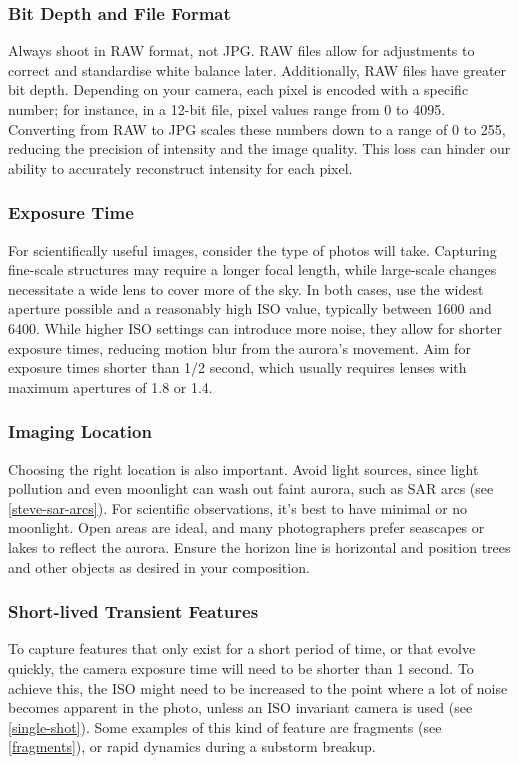 \documentclass{article}
\begin{document}
\subsubsection{Bit Depth and File Format}
Always shoot in RAW format, not JPG. RAW files allow for adjustments to correct and standardise white balance later. Additionally, RAW files have greater bit depth. Depending on your camera, each pixel is encoded with a specific number; for instance, in a 12-bit file, pixel values range from 0 to 4095. Converting from RAW to JPG scales these numbers down to a range of 0 to 255, reducing the precision of intensity and the image quality. This loss can hinder our ability to accurately reconstruct intensity for each pixel.

\subsubsection{Exposure Time}
For scientifically useful images, consider the type of photos will take. Capturing fine-scale structures may require a longer focal length, while large-scale changes necessitate a wide lens to cover more of the sky. In both cases, use the widest aperture possible and a reasonably high ISO value, typically between 1600 and 6400. While higher ISO settings can introduce more noise, they allow for shorter exposure times, reducing motion blur from the aurora's movement. Aim for exposure times shorter than 1/2 second, which usually requires lenses with maximum apertures of 1.8 or 1.4.

\subsubsection{Imaging Location}
Choosing the right location is also important. Avoid light sources, since light pollution and even moonlight can wash out faint aurora, such as SAR arcs (see \ref{steve-sar-arcs}). For scientific observations, it’s best to have minimal or no moonlight. Open areas are ideal, and many photographers prefer seascapes or lakes to reflect the aurora. Ensure the horizon line is horizontal and position trees and other objects as desired in your composition.

\subsubsection{Short-lived Transient Features}\label{short-lived-transient-features}
To capture features that only exist for a short period of time, or that evolve quickly, the camera exposure time will need to be shorter than 1 second. To achieve this, the ISO might need to be increased to the point where a lot of noise becomes apparent in the photo, unless an ISO invariant camera is used (see \ref{single-shot}). Some examples of this kind of feature are fragments (see \ref{fragments}), or rapid dynamics during a substorm breakup.
\end{document}
